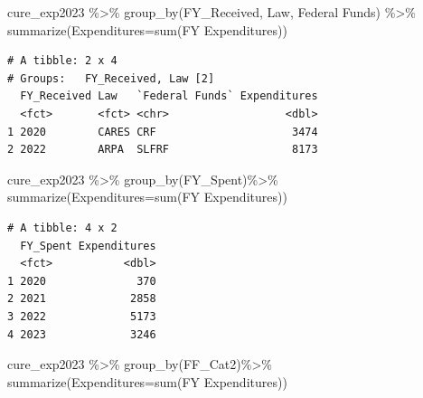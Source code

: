 \documentclass[
  letterpaper,
  DIV=11,
  numbers=noendperiod]{scrreport}
\newenvironment{Shaded}{\begin{snugshade}}{\end{snugshade}}
\newcommand{\AttributeTok}[1]{\textcolor[rgb]{0.40,0.45,0.13}{#1}}
\newcommand{\FunctionTok}[1]{\textcolor[rgb]{0.28,0.35,0.67}{#1}}
\newcommand{\NormalTok}[1]{\textcolor[rgb]{0.00,0.23,0.31}{#1}}
\newcommand{\SpecialCharTok}[1]{\textcolor[rgb]{0.37,0.37,0.37}{#1}}
\newcommand{\StringTok}[1]{\textcolor[rgb]{0.13,0.47,0.30}{#1}}
\begin{document}
\begin{Shaded}
\begin{Highlighting}[]
\NormalTok{cure\_exp2023 }\SpecialCharTok{\%\textgreater{}\%} 
  \FunctionTok{group\_by}\NormalTok{(FY\_Received, Law, }\StringTok{\textasciigrave{}}\AttributeTok{Federal Funds}\StringTok{\textasciigrave{}}\NormalTok{) }\SpecialCharTok{\%\textgreater{}\%} 
  \FunctionTok{summarize}\NormalTok{(}\AttributeTok{Expenditures=}\FunctionTok{sum}\NormalTok{(}\StringTok{\textasciigrave{}}\AttributeTok{FY Expenditures}\StringTok{\textasciigrave{}}\NormalTok{))}
\end{Highlighting}
\end{Shaded}

\begin{verbatim}
# A tibble: 2 x 4
# Groups:   FY_Received, Law [2]
  FY_Received Law   `Federal Funds` Expenditures
  <fct>       <fct> <chr>                  <dbl>
1 2020        CARES CRF                     3474
2 2022        ARPA  SLFRF                   8173
\end{verbatim}

\begin{Shaded}
\begin{Highlighting}[]
\NormalTok{cure\_exp2023 }\SpecialCharTok{\%\textgreater{}\%} 
  \FunctionTok{group\_by}\NormalTok{(}\StringTok{\textasciigrave{}}\AttributeTok{FY\_Spent}\StringTok{\textasciigrave{}}\NormalTok{)}\SpecialCharTok{\%\textgreater{}\%} 
  \FunctionTok{summarize}\NormalTok{(}\AttributeTok{Expenditures=}\FunctionTok{sum}\NormalTok{(}\StringTok{\textasciigrave{}}\AttributeTok{FY Expenditures}\StringTok{\textasciigrave{}}\NormalTok{))}
\end{Highlighting}
\end{Shaded}

\begin{verbatim}
# A tibble: 4 x 2
  FY_Spent Expenditures
  <fct>           <dbl>
1 2020              370
2 2021             2858
3 2022             5173
4 2023             3246
\end{verbatim}

\begin{Shaded}
\begin{Highlighting}[]
\NormalTok{cure\_exp2023 }\SpecialCharTok{\%\textgreater{}\%}
  \FunctionTok{group\_by}\NormalTok{(FF\_Cat2)}\SpecialCharTok{\%\textgreater{}\%} 
  \FunctionTok{summarize}\NormalTok{(}\AttributeTok{Expenditures=}\FunctionTok{sum}\NormalTok{(}\StringTok{\textasciigrave{}}\AttributeTok{FY Expenditures}\StringTok{\textasciigrave{}}\NormalTok{))}
\end{Highlighting}
\end{Shaded}
\end{document}
